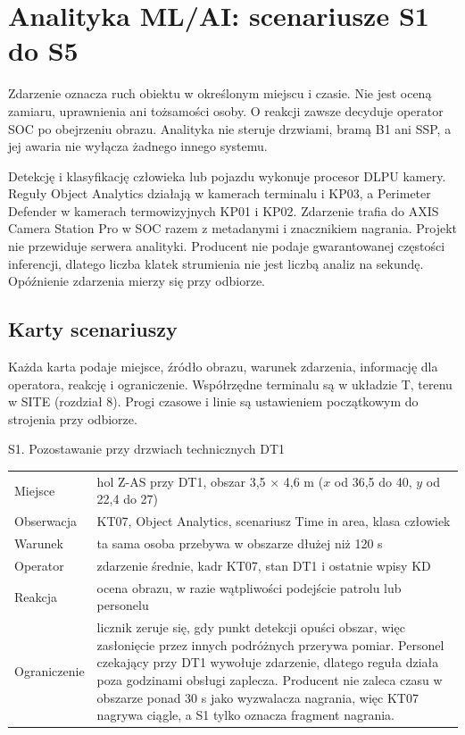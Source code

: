 \section{Analityka ML/AI: scenariusze S1 do S5}

Zdarzenie oznacza ruch obiektu w określonym miejscu i czasie. Nie jest oceną zamiaru, uprawnienia ani tożsamości osoby. O reakcji zawsze decyduje operator SOC po obejrzeniu obrazu. Analityka nie steruje drzwiami, bramą B1 ani SSP, a jej awaria nie wyłącza żadnego innego systemu.


Detekcję i klasyfikację człowieka lub pojazdu wykonuje procesor DLPU kamery. Reguły Object Analytics działają w kamerach terminalu i KP03, a Perimeter Defender w kamerach termowizyjnych KP01 i KP02. Zdarzenie trafia do AXIS Camera Station Pro w SOC razem z metadanymi i znacznikiem nagrania. Projekt nie przewiduje serwera analityki. Producent nie podaje gwarantowanej częstości inferencji, dlatego liczba klatek strumienia nie jest liczbą analiz na sekundę. Opóźnienie zdarzenia mierzy się przy odbiorze.\cite{S-AOA,S-AOA2,S-PD}

\subsection*{Karty scenariuszy}
Każda karta podaje miejsce, źródło obrazu, warunek zdarzenia, informację dla operatora, reakcję i ograniczenie. Współrzędne terminalu są w układzie T, terenu w SITE (rozdział 8). Progi czasowe i linie są ustawieniem początkowym do strojenia przy odbiorze.

\begin{note}{S1. Pozostawanie przy drzwiach technicznych DT1}
\small
\begin{tabularx}{\linewidth}{@{}P{2.6cm}Y@{}}
Miejsce & hol Z-AS przy DT1, obszar 3,5 $\times$ 4,6 m ($x$ od 36,5 do 40, $y$ od 22,4 do 27) \\
Obserwacja & KT07, Object Analytics, scenariusz Time in area, klasa człowiek \\
Warunek & ta sama osoba przebywa w obszarze dłużej niż 120 s \\
Operator & zdarzenie średnie, kadr KT07, stan DT1 i ostatnie wpisy KD \\
Reakcja & ocena obrazu, w razie wątpliwości podejście patrolu lub personelu \\
Ograniczenie & licznik zeruje się, gdy punkt detekcji opuści obszar, więc zasłonięcie przez innych podróżnych przerywa pomiar. Personel czekający przy DT1 wywołuje zdarzenie, dlatego reguła działa poza godzinami obsługi zaplecza. Producent nie zaleca czasu w obszarze ponad 30 s jako wyzwalacza nagrania, więc KT07 nagrywa ciągle, a S1 tylko oznacza fragment nagrania. \\
\end{tabularx}
\end{note}

